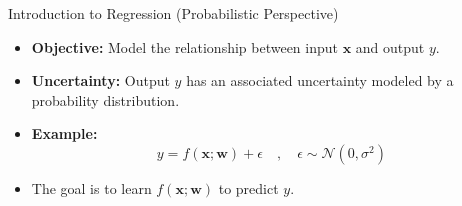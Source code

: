 \documentclass[serif, aspectratio=169]{beamer}
\begin{document}


    \begin{frame}{Introduction to Regression (Probabilistic Perspective)}
        \begin{itemize}
            \item \textbf{Objective:} Model the relationship between input \( \mathbf{x} \) and output \( y \).
            \item \textbf{Uncertainty:} Output \( y \) has an associated uncertainty modeled by a probability distribution.
            \item \textbf{Example:}
            \[
                y = f(\mathbf{x}; \mathbf{w}) + \epsilon \quad , \quad \epsilon \sim \mathcal{N}(0, \sigma^2)
            \]
            \item The goal is to learn \( f(\mathbf{x}; \mathbf{w}) \) to predict \( y \).
        \end{itemize}
    \end{frame}
\end{document}
